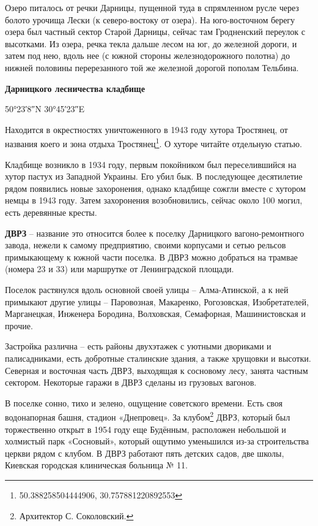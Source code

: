 Озеро питалось от речки Дарницы, пущенной туда в спрямленном русле через болото урочища Лески (к северо-востоку от озера). На юго-восточном берегу озера был частный сектор Старой Дарницы, сейчас там Гродненский переулок с высотками. Из озера, речка текла дальше лесом на юг, до железной дороги, и затем под нею, вдоль нее (с южной стороны железнодорожного полотна) до нижней половины перерезанного той же железной дорогой пополам Тельбина.\\

\medskip

\textbf{Дарницкого лесничества кладбище} 

50°23′8″N 30°45′23″E

Находится в окрестностях уничтоженного в 1943 году хутора Тростянец, от названия коего и зона отдыха Тростянец\footnote{50.388258504444906, 30.757881220892553}. О хуторе читайте отдельную статью.

Кладбище возникло в 1934 году, первым покойником был переселившийся на хутор пастух из Западной Украины. Его убил бык. В последующее десятилетие рядом появились новые захоронения, однако кладбище сожгли вместе с хутором немцы в 1943 году. Затем захоронения возобновились, сейчас около 100  могил, есть деревянные кресты.\\

\medskip

\textbf{ДВРЗ} – название это относится более к поселку Дарницкого вагоно-ремонтного завода, нежели к самому предприятию, своими корпусами и сетью рельсов примыкающему к южной части поселка. В ДВРЗ можно добраться на трамвае (номера 23 и 33) или маршрутке от Ленинградской площади.

Поселок растянулся вдоль основной своей улицы – Алма-Атинской, а к ней примыкают другие улицы – Паровозная, Макаренко, Рогозовская, Изобретателей, Марганецкая, Инженера Бородина, Волховская, Семафорная, Машинистовская и прочие.

Застройка различна – есть районы двухэтажек с уютными двориками и палисадниками, есть добротные сталинские здания, а также хрущовки и высотки. Северная и восточная часть ДВРЗ, выходящая к сосновому лесу, занята частным сектором. Некоторые гаражи в ДВРЗ сделаны из грузовых вагонов.

В поселке сонно, тихо и зелено, ощущение советского времени. Есть своя водонапорная башня, стадион «Днепровец». За клубом\footnote{Архитектор С. Соколовский.} ДВРЗ, который был торжественно открыт в 1954 году еще Будённым, расположен небольшой и холмистый парк «Сосновый», который ощутимо уменьшился из-за строительства церкви рядом с клубом. В ДВРЗ работают пять детских садов, две школы, Киевская городская клиническая больница № 11.

